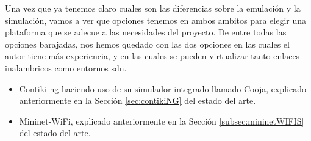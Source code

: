 Una vez que ya tenemos claro cuales son las diferencias sobre la emulación y la simulación, vamos a ver que opciones tenemos en ambos ambitos para elegir una plataforma que se adecue a las necesidades del proyecto. De entre todas las opciones barajadas, nos hemos quedado con las dos opciones en las cuales el autor tiene más experiencia, y en las cuales se pueden virtualizar tanto enlaces inalambricos como entornos \gls{sdn}.

\begin{itemize}
    \item Contiki-ng haciendo uso de su simulador integrado llamado Cooja, explicado anteriormente en la Sección \ref{sec:contikiNG} del estado del arte.

    \item Mininet-WiFi, explicado anteriormente en la Sección \ref{subsec:mininetWIFIS} del estado del arte.
\end{itemize}

